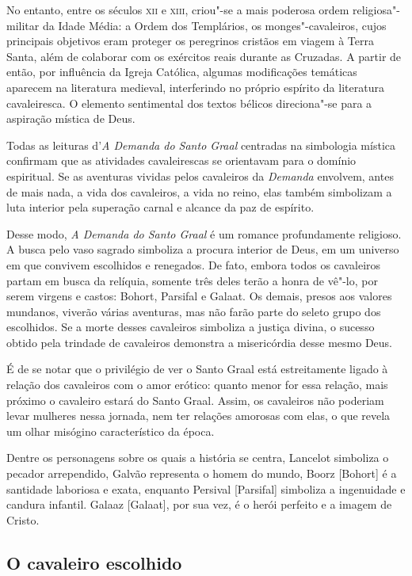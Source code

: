 \documentclass{extarticle}
\begin{document}
No entanto, entre os séculos \textsc{xii} e \textsc{xiii}, criou"-se a mais
poderosa ordem religiosa"-militar da Idade Média: a Ordem dos Templários,
os monges"-cavaleiros, cujos principais objetivos eram proteger os
peregrinos cristãos em viagem à Terra Santa, além de colaborar com os
exércitos reais durante as Cruzadas. A partir de então, por influência
da Igreja Católica, algumas modificações temáticas aparecem na
literatura medieval, interferindo no próprio espírito da literatura
cavaleiresca. O elemento sentimental dos textos bélicos direciona"-se
para a aspiração mística de Deus.

Todas as leituras d'\emph{A Demanda do Santo
Graal} centradas na simbologia mística confirmam que as atividades
cavaleirescas se orientavam para o domínio espiritual. Se as aventuras
vividas pelos cavaleiros da \emph{Demanda} envolvem, antes de mais nada,
a vida dos cavaleiros, a vida no reino, elas também simbolizam a luta
interior pela superação carnal e alcance da paz de
espírito.

Desse modo, \emph{A Demanda do Santo Graal} é
um romance profundamente religioso. A busca pelo vaso sagrado simboliza
a procura interior de Deus, em um universo em que convivem escolhidos e
renegados. De fato, embora todos os cavaleiros partam em busca da
relíquia, somente três deles terão a honra de vê"-lo, por serem virgens e
castos: Bohort, Parsifal e Galaat. Os demais, presos aos valores
mundanos, viverão várias aventuras, mas não farão parte do seleto grupo
dos escolhidos. Se a morte desses cavaleiros simboliza a justiça divina,
o sucesso obtido pela trindade de cavaleiros demonstra a misericórdia
desse mesmo Deus.

É de se notar que o privilégio de ver o Santo Graal está
estreitamente ligado à relação dos cavaleiros com o amor erótico: quanto
menor for essa relação, mais próximo o cavaleiro estará do Santo Graal.
Assim, os cavaleiros não poderiam levar mulheres nessa jornada, nem ter
relações amorosas com elas, o que revela um olhar misógino
característico da época.

Dentre os personagens sobre os quais a história se centra,
Lancelot simboliza o pecador arrependido, Galvão representa o homem do
mundo, Boorz {[}Bohort{]} é a santidade laboriosa e exata, enquanto
Persival {[}Parsifal{]} simboliza a ingenuidade e candura infantil.
Galaaz {[}Galaat{]}, por sua vez, é o herói perfeito e a imagem de
Cristo.

\subsection{O cavaleiro escolhido}
\end{document}
